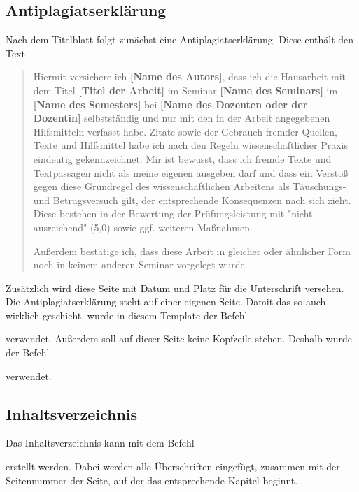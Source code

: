 \documentclass[
     11pt,         %
     a4paper,      %
     oneside,
     ]{article}
\begin{document}
\subsection{Antiplagiatserklärung}\label{subsec:antiplag}
Nach dem Titelblatt folgt zunächst eine Antiplagiatserklärung. Diese enthält den Text

\begin{quotation}
Hiermit versichere ich \textbf{[Name des Autors]}, dass ich die Hausarbeit mit dem Titel \textbf{[Titel der Arbeit]}
im Seminar \textbf{[Name des Seminars]}
im \textbf{[Name des Semesters]}
bei \textbf{[Name des Dozenten oder der Dozentin]}
selbstständig und nur mit den in der Arbeit angegebenen Hilfsmitteln verfasst habe.
Zitate sowie der Gebrauch fremder Quellen, Texte und Hilfsmittel habe ich nach den
Regeln wissenschaftlicher Praxis eindeutig gekennzeichnet. Mir ist bewusst, dass ich
fremde Texte und Textpassagen nicht als meine eigenen ausgeben darf und dass ein
Verstoß gegen diese Grundregel des wissenschaftlichen Arbeitens als Täuschungs- und
Betrugsversuch gilt, der entsprechende Konsequenzen nach sich zieht. Diese bestehen
in der Bewertung der Prüfungsleistung mit "nicht ausreichend" (5,0) sowie ggf. weiteren
Maßnahmen.

Außerdem bestätige ich, dass diese Arbeit in gleicher oder ähnlicher Form noch in keinem anderen Seminar vorgelegt wurde.
\end{quotation}

Zusätzlich wird diese Seite mit Datum und Platz für die Unterschrift versehen. Die Antiplagiatserklärung steht auf einer eigenen Seite. Damit das so auch wirklich geschieht, wurde in diesem Template der Befehl \begin{verbatim*}\newpage\end{verbatim*} verwendet. Außerdem soll auf dieser Seite keine Kopfzeile stehen. Deshalb wurde der Befehl \begin{verbatim*}\thispagestyle{empty}\end{verbatim*} verwendet.


\subsection{Inhaltsverzeichnis}\label{subsec:inhaltsverzeichnis}
Das Inhaltsverzeichnis kann mit dem Befehl
\begin{verbatim*}\tableofcontents\end{verbatim*}
erstellt werden. Dabei werden alle Überschriften eingefügt, zusammen mit der Seitennummer der Seite, auf der das entsprechende Kapitel beginnt.
\end{document}
